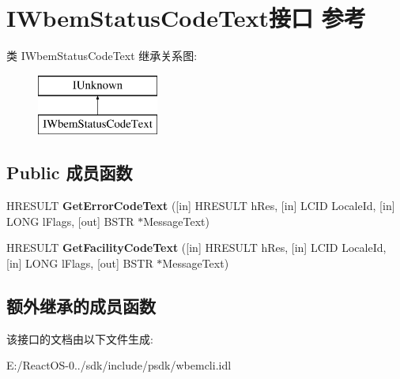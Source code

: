 \hypertarget{interface_i_wbem_status_code_text}{}\section{I\+Wbem\+Status\+Code\+Text接口 参考}
\label{interface_i_wbem_status_code_text}
类 I\+Wbem\+Status\+Code\+Text 继承关系图\+:\begin{figure}[H]
\begin{center}
\leavevmode
\includegraphics[height=2.000000cm]{interface_i_wbem_status_code_text}
\end{center}
\end{figure}
\subsection*{Public 成员函数}
\begin{DoxyCompactItemize}
\item 
\mbox{\label{interface_i_wbem_status_code_text_aac17425ff97c70632f17b5549afef50b}} 
H\+R\+E\+S\+U\+LT {\bfseries Get\+Error\+Code\+Text} (\mbox{[}in\mbox{]} H\+R\+E\+S\+U\+LT h\+Res, \mbox{[}in\mbox{]} L\+C\+ID Locale\+Id, \mbox{[}in\mbox{]} L\+O\+NG l\+Flags, \mbox{[}out\mbox{]} B\+S\+TR $\ast$Message\+Text)
\item 
\mbox{\label{interface_i_wbem_status_code_text_ace481e7936563aa92a801e9f6d5839c2}} 
H\+R\+E\+S\+U\+LT {\bfseries Get\+Facility\+Code\+Text} (\mbox{[}in\mbox{]} H\+R\+E\+S\+U\+LT h\+Res, \mbox{[}in\mbox{]} L\+C\+ID Locale\+Id, \mbox{[}in\mbox{]} L\+O\+NG l\+Flags, \mbox{[}out\mbox{]} B\+S\+TR $\ast$Message\+Text)
\end{DoxyCompactItemize}
\subsection*{额外继承的成员函数}


该接口的文档由以下文件生成\+:\begin{DoxyCompactItemize}
\item 
E\+:/\+React\+O\+S-\/0../sdk/include/psdk/wbemcli.\+idl\end{DoxyCompactItemize}
